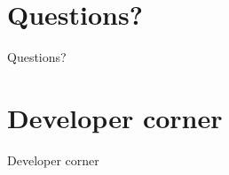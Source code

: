 \documentclass[
  ignorenonframetext,
  aspectratio=169,
  t]{beamer}
\begin{document}
\section*{Questions?}\label{questions}

\begin{frame}[c]{}
\protect{}\label{section}
\centering

\Large Questions?
\end{frame}

\section*{Developer corner}\label{developer-corner}

\begin{frame}[c]{}
\protect{}\label{section-1}
\centering

\Large Developer corner
\end{frame}
\end{document}
